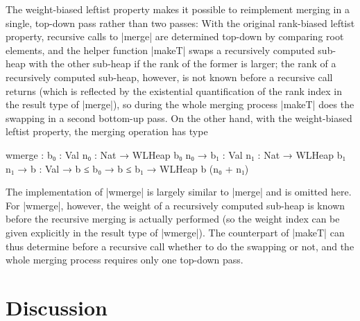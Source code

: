 The weight-biased leftist property makes it possible to reimplement merging in a single, top-down pass rather than two passes:
With the original rank-biased leftist property, recursive calls to |merge| are determined top-down by comparing root elements, and the helper function |makeT| swaps a recursively computed sub-heap with the other sub-heap if the rank of the former is larger; the rank of a recursively computed sub-heap, however, is not known before a recursive call returns (which is reflected by the existential quantification of the rank index in the result type of |merge|), so during the whole merging process |makeT| does the swapping in a second bottom-up pass.
On the other hand, with the weight-biased leftist property, the merging operation has type
\begin{code}
wmerge :  {b₀  : Val} {n₀  : Nat} → WLHeap  b₀  n₀  →
          {b₁  : Val} {n₁  : Nat} → WLHeap  b₁  n₁  →
          {b   : Val} → b ≤ b₀ → b ≤ b₁ → WLHeap b (n₀ + n₁)
\end{code}
The implementation of |wmerge| is largely similar to |merge| and is omitted here.
For |wmerge|, however, the weight of a recursively computed sub-heap is known before the recursive merging is actually performed (so the weight index can be given explicitly in the result type of |wmerge|).
The counterpart of |makeT| can thus determine before a recursive call whether to do the swapping or not, and the whole merging process requires only one top-down pass.


\section{Discussion}
\label{sec:ornament-refinement-discussion}

